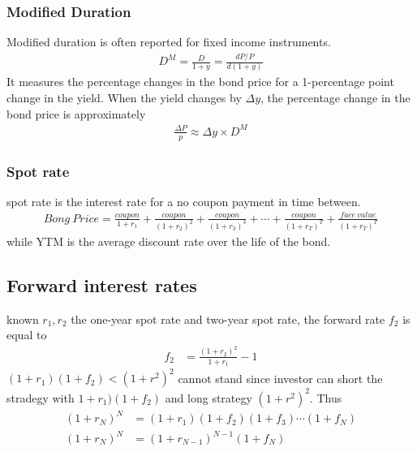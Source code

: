 \documentclass{article}
\theoremstyle{definition}
\theoremstyle{thrm}
\theoremstyle{lma}
\theoremstyle{ppst}
\theoremstyle{crlr}
\begin{document}
\subsubsection{Modified Duration}
Modified duration is often reported for fixed income instruments.
\begin{align*}
	D^M = \frac{D}{1+y} = \frac{dP/P}{d(1+y)}
\end{align*}
It measures the percentage changes in the bond price for a 1-percentage point  change in the yield. When the yield changes by $\Delta y$, the percentage change in the bond price is approximately 
\begin{align*}
	\frac{\Delta P}{p} \approx \Delta y \times D^M
\end{align*}
\subsubsection{Spot rate}
spot rate is the interest rate for a no coupon payment in time between. 
\begin{align*}
	Bong\ Price = \frac{coupon}{1+r_1}+\frac{coupon}{(1+r_2)^2}+\frac{coupon}{(1+r_3)^3}+\cdots+\frac{coupon}{(1+r_T)^T}+\frac{face\ value}{(1+r_T)^T}
\end{align*}
while YTM is the average discount rate over the life of the bond. 
\subsection{Forward interest rates}
known $r_1, r_2$ the one-year spot rate and two-year spot rate, the forward rate $f_2$ is equal to 
\begin{align*}
	f_2 &= \frac{(1+r_2)^2}{1+r_1}-1
\end{align*} 
$(1+r_1)(1+f_2) < (1+r^2)^2$ cannot stand since investor can short the stradegy with $1+r_1)(1+f_2)$ and long strategy $(1+r^2)^2$. Thus
\begin{align*}
	(1+r_N)^N &= (1+r_1)(1+f_2)(1+f_3)\cdots(1+f_N)\\
	(1+r_N)^N &=(1+r_{N-1})^{N-1}(1+f_N)
\end{align*}
\end{document}
